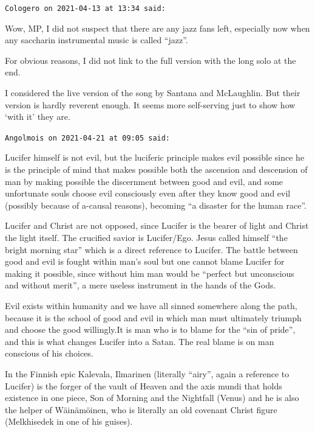 \begin{footnotesize}
\begin{sffamily}
\hfill

\texttt{Cologero on 2021-04-13 at 13:34 said:}

Wow, MP, I did not suspect that there are any jazz fans left, especially now when any saccharin instrumental music is called ``jazz''.

For obvious reasons, I did not link to the full version with the long solo at the end.

I considered the live version of the song by Santana and McLaughlin. But their version is hardly reverent enough. It seems more self-serving just to show how `with it' they are.

\hfill

\texttt{Angolmois on 2021-04-21 at 09:05 said:}

Lucifer himself is not evil, but the luciferic principle makes evil possible since he is the principle of mind that makes possible both the ascension and descension of man by making possible the discernment between good and evil, and some unfortunate souls choose evil consciously even after they know good and evil (possibly because of a-causal reasons), becoming ``a disaster for the human race''.

Lucifer and Christ are not opposed, since Lucifer is the bearer of light and Christ the light itself. The crucified savior is Lucifer/Ego. Jesus called himself ``the bright morning star'' which is a direct reference to Lucifer. The battle between good and evil is fought within man's soul but one cannot blame Lucifer for making it possible, since without him man would be ``perfect but unconscious and without merit'', a mere useless instrument in the hands of the Gods.

Evil exists within humanity and we have all sinned somewhere along the path, because it is the school of good and evil in which man must ultimately triumph and choose the good willingly.It is man who is to blame for the ``sin of pride'', and this is what changes Lucifer into a Satan. The real blame is on man conscious of his choices.

In the Finnish epic Kalevala, Ilmarinen (literally ``airy'', again a reference to Lucifer) is the forger of the vault of Heaven and the axis mundi that holds existence in one piece, Son of Morning and the Nightfall (Venus) and he is also the helper of Wäinämöinen, who is literally an old covenant Christ figure (Melkhisedek in one of his guises).

\end{sffamily}
\end{footnotesize}

